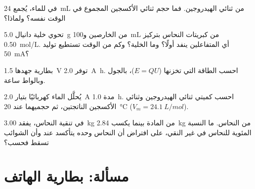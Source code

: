 \begin{exercise}[$\star\star$]\label{exo:g12:cells-and-electrolysis:11}
في  للماء، يُجمع \qty{24}{mL} من ثنائي الهيدروجين.
فما حجم ثنائي الأكسجين المجموع في الوقت نفسه؟ ولماذا؟
\end{exercise}

\begin{exercise}[$\star\star\star$]\label{exo:g12:cells-and-electrolysis:12}
تحوي خلية دانيال \qty{5.0}{g} من الخارصين و\qty{100}{mL} من كبريتات
النحاس بتركيز \qty{0.50}{mol/L}. أي المتفاعلين ينفد أولًا؟ وما
 الخلية؟ وكم من الوقت تستطيع توليد \qty{50}{mA}؟
\end{exercise}

\begin{exercise}[$\star\star\star$]\label{exo:g12:cells-and-electrolysis:13}
بطارية جهدها \qty{1.5}{V} توفر \qty{2.0}{A.h}. احسب الطاقة التي
تخزنها ($E = Q U$)، بالجول وبالواط ساعة.
\end{exercise}

\begin{exercise}[$\star\star\star$]\label{exo:g12:cells-and-electrolysis:14}
يُحلَّل الماء كهربائيًا بتيار \qty{2.0}{A} مدة \qty{1.0}{h}. احسب
كميتي ثنائي الهيدروجين وثنائي الأكسجين الناتجتين، ثم حجميهما عند \qty{20}{\celsius} ($V_m = \qty{24.1}{L/mol}$).
\end{exercise}

\begin{exercise}[$\star\star\star$]\label{exo:g12:cells-and-electrolysis:15}
في تنقية النحاس، يفقد  \qty{3.00}{kg} من المادة بينما
يكسب  \qty{2.84}{kg} من النحاس. ما النسبة المئوية للنحاس
في  غير النقي، على افتراض أن النحاس وحده يتأكسد عند 
وأن الشوائب تسقط فحسب؟
\end{exercise}

\section{مسألة: بطارية الهاتف}

